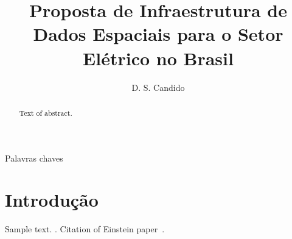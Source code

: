 \documentclass[12pt,5p]{elsarticle}
\begin{document}
\begin{frontmatter}

\title{Proposta de Infraestrutura de Dados Espaciais para o Setor El\'etrico no Brasil} %

\author{D. S. Candido}
\address{Brasilia, Brasil}





\begin{abstract}
Text of abstract. 
\end{abstract}


\begin{keyword}
Palavras chaves
\end{keyword}

\end{frontmatter}


\section{Introdu\c{c}\~ao}
\label{sec1}

Sample text. . Citation of Einstein paper~\cite{Einstein}.

\end{document}
